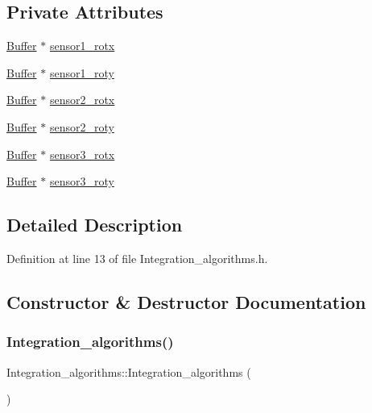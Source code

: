 \subsection*{Private Attributes}
\begin{DoxyCompactItemize}
\item 
\mbox{\hyperlink{class_buffer}{Buffer}} $\ast$ \mbox{\hyperlink{class_integration__algorithms_a29875d9357df6ac6be6884b4dd086e99}{sensor1\+\_\+rotx}}
\item 
\mbox{\hyperlink{class_buffer}{Buffer}} $\ast$ \mbox{\hyperlink{class_integration__algorithms_a2e6ecf3dec5dd79a83509417ba119b29}{sensor1\+\_\+roty}}
\item 
\mbox{\hyperlink{class_buffer}{Buffer}} $\ast$ \mbox{\hyperlink{class_integration__algorithms_ae12aab372ffece29e31c4001267682b0}{sensor2\+\_\+rotx}}
\item 
\mbox{\hyperlink{class_buffer}{Buffer}} $\ast$ \mbox{\hyperlink{class_integration__algorithms_a7c3f8e0bdb68032f29a5226cc1728428}{sensor2\+\_\+roty}}
\item 
\mbox{\hyperlink{class_buffer}{Buffer}} $\ast$ \mbox{\hyperlink{class_integration__algorithms_a6a1bad9a3c085c33d6a4922a007b6a9b}{sensor3\+\_\+rotx}}
\item 
\mbox{\hyperlink{class_buffer}{Buffer}} $\ast$ \mbox{\hyperlink{class_integration__algorithms_a4170f08224c157734de64da6286bb6ea}{sensor3\+\_\+roty}}
\end{DoxyCompactItemize}


\subsection{Detailed Description}


Definition at line 13 of file Integration\+\_\+algorithms.\+h.



\subsection{Constructor \& Destructor Documentation}
\mbox{\label{class_integration__algorithms_adc24b9c4f28db0e56755297e0f3eaa27}} 
\subsubsection{\texorpdfstring{Integration\_algorithms()}{Integration\_algorithms()}}
{\footnotesize\ttfamily Integration\+\_\+algorithms\+::\+Integration\+\_\+algorithms (\begin{DoxyParamCaption}{ }\end{DoxyParamCaption})}




